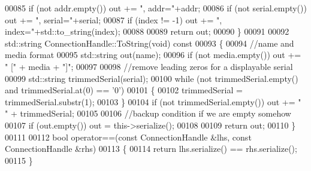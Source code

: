 \begin{DoxyCode}
00085     \textcolor{keywordflow}{if} (not addr.empty()) out += \textcolor{stringliteral}{", addr="}+addr;
00086     \textcolor{keywordflow}{if} (not serial.empty()) out += \textcolor{stringliteral}{", serial="}+serial;
00087     \textcolor{keywordflow}{if} (index != -1) out += \textcolor{stringliteral}{", index="}+std::to\_string(index);
00088 
00089     \textcolor{keywordflow}{return} out;
00090 \}
00091 
00092 std::string ConnectionHandle::ToString(\textcolor{keywordtype}{void})\textcolor{keyword}{ const}
00093 \textcolor{keyword}{}\{
00094     \textcolor{comment}{//name and media format}
00095     std::string out(name);
00096     \textcolor{keywordflow}{if} (not media.empty()) out += \textcolor{stringliteral}{" ["} + media + \textcolor{stringliteral}{"]"};
00097 
00098     \textcolor{comment}{//remove leading zeros for a displayable serial}
00099     std::string trimmedSerial(serial);
00100     \textcolor{keywordflow}{while} (not trimmedSerial.empty() and trimmedSerial.at(0) == \textcolor{charliteral}{'0'})
00101     \{
00102         trimmedSerial = trimmedSerial.substr(1);
00103     \}
00104     \textcolor{keywordflow}{if} (not trimmedSerial.empty()) out += \textcolor{stringliteral}{" "} + trimmedSerial;
00105 
00106     \textcolor{comment}{//backup condition if we are empty somehow}
00107     \textcolor{keywordflow}{if} (out.empty()) out = this->serialize();
00108 
00109     \textcolor{keywordflow}{return} out;
00110 \}
00111 
00112 \textcolor{keywordtype}{bool} operator==(\textcolor{keyword}{const} ConnectionHandle &lhs, \textcolor{keyword}{const} ConnectionHandle &rhs)
00113 \{
00114     \textcolor{keywordflow}{return} lhs.serialize() == rhs.serialize();
00115 \}
\end{DoxyCode}
